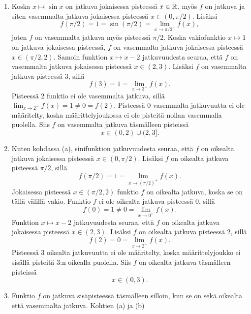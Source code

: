 \documentclass[11pt,a4paper]{amsart}
\begin{document}
\begin{solution}
  \leavevmode\par
  \begin{enumerate}[label=(\alph*), nosep]
    \item Koska \(x \mapsto \sin x\) on jatkuva jokaisessa pisteessä
      \(x \in \mathbb{R}\), myös \(f\) on jatkuva ja siten vasemmalta jatkuva
      jokaisessa pisteessä \(x \in (0, \pi/2)\).
      Lisäksi
      \[
        f(\pi/2) = 1 = \sin(\pi/2) = \lim_{x \to \pi/2^-} f(x),
      \]
      joten \(f\) on vasemmalta jatkuva myös pisteessä \(\pi/2\).
      Koska vakiofunktio \(x \mapsto 1\) on jatkuva jokaisessa pisteessä,
      \(f\) on vasemmalta jatkuva jokaisessa pisteessä
      \(x \in (\pi/2, 2)\). Samoin funktion \(x \mapsto x - 2\)
      jatkuvuudesta seuraa, että \(f\) on vasemmalta jatkuva jokaisessa
      pisteessä \(x \in (2, 3)\). Lisäksi \(f\) on vasemmalta jatkuva
      pisteessä \(3\), sillä
      \[
        f(3) = 1 = \lim_{x \to 3^-} f(x).
      \]
      Pisteessä \(2\) funktio ei ole vasemmalta jatkuva, sillä
      \(\lim_{x \to 2^-} f(x) = 1 \neq 0 = f(2)\).
      Pisteessä \(0\) vasemmalta jatkuvuutta ei ole määritelty, koska
      määrittelyjoukossa ei ole pisteitä nollan vasemmalla puolella.
      Siis \(f\) on vasemmalta jatkuva täsmälleen pisteissä
      \[
        x \in (0, 2) \cup (2, 3].
      \]
    \item Kuten kohdassa (a), sinifunktion jatkuvuudesta seuraa, että
      \(f\) on oikealta jatkuva jokaisessa pisteessä
      \(x \in (0, \pi/2)\).
      Lisäksi \(f\) on oikealta jatkuva pisteessä \(\pi/2\), sillä
      \[
        f(\pi/2) = 1 = \lim_{x \to (\pi/2)^+} f(x).
      \]
      Jokaisessa pisteessä \(x \in (\pi/2, 2)\) funktio \(f\) on
      oikealta jatkuva, koska se on tällä välillä vakio.
      Funktio \(f\) ei ole oikealta jatkuva pisteessä \(0\), sillä
      \[
        f(0) = 1 \neq 0 = \lim_{x \to 0^+} f(x).
      \]
      Funktion \(x \mapsto x - 2\) jatkuvuudesta seuraa, että \(f\) on
      oikealta jatkuva jokaisessa pisteessä \(x \in (2, 3)\).
      Lisäksi \(f\) on oikealta jatkuva pisteessä \(2\), sillä
      \[
        f(2) = 0 = \lim_{x \to 2^+} f(x).
      \]
      Pisteessä \(3\) oikealta jatkuvuutta ei ole määritelty, koska
      määrittelyjoukko ei sisällä pisteitä \(3\):n oikealla puolella.
      Siis \(f\) on oikealta jatkuva täsmälleen pisteissä
      \[
        x \in (0, 3).
      \]
    \item Funktio \(f\) on jatkuva sisäpisteessä täsmälleen silloin, kun
      se on sekä oikealta että vasemmalta jatkuva. Kohtien (a) ja (b)

\end{enumerate}
\end{solution}
\end{document}
